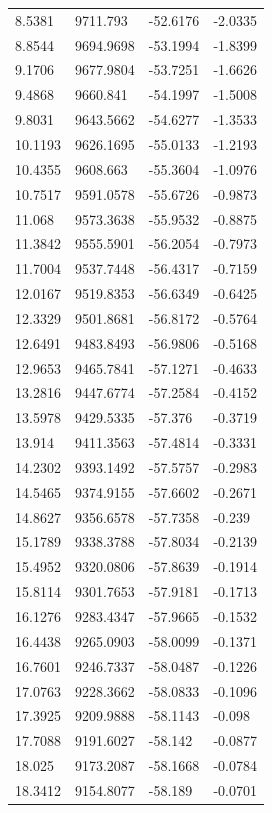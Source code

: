 \begin{table}[H]
\begin{tabular}{llll}
8.5381 & 9711.793 & -52.6176 & -2.0335 \\
8.8544 & 9694.9698 & -53.1994 & -1.8399 \\
9.1706 & 9677.9804 & -53.7251 & -1.6626 \\
9.4868 & 9660.841 & -54.1997 & -1.5008 \\
9.8031 & 9643.5662 & -54.6277 & -1.3533 \\
10.1193 & 9626.1695 & -55.0133 & -1.2193 \\
10.4355 & 9608.663 & -55.3604 & -1.0976 \\
10.7517 & 9591.0578 & -55.6726 & -0.9873 \\
11.068 & 9573.3638 & -55.9532 & -0.8875 \\
11.3842 & 9555.5901 & -56.2054 & -0.7973 \\
11.7004 & 9537.7448 & -56.4317 & -0.7159 \\
12.0167 & 9519.8353 & -56.6349 & -0.6425 \\
12.3329 & 9501.8681 & -56.8172 & -0.5764 \\
12.6491 & 9483.8493 & -56.9806 & -0.5168 \\
12.9653 & 9465.7841 & -57.1271 & -0.4633 \\
13.2816 & 9447.6774 & -57.2584 & -0.4152 \\
13.5978 & 9429.5335 & -57.376 & -0.3719 \\
13.914 & 9411.3563 & -57.4814 & -0.3331 \\
14.2302 & 9393.1492 & -57.5757 & -0.2983 \\
14.5465 & 9374.9155 & -57.6602 & -0.2671 \\
14.8627 & 9356.6578 & -57.7358 & -0.239 \\
15.1789 & 9338.3788 & -57.8034 & -0.2139 \\
15.4952 & 9320.0806 & -57.8639 & -0.1914 \\
15.8114 & 9301.7653 & -57.9181 & -0.1713 \\
16.1276 & 9283.4347 & -57.9665 & -0.1532 \\
16.4438 & 9265.0903 & -58.0099 & -0.1371 \\
16.7601 & 9246.7337 & -58.0487 & -0.1226 \\
17.0763 & 9228.3662 & -58.0833 & -0.1096 \\
17.3925 & 9209.9888 & -58.1143 & -0.098 \\
17.7088 & 9191.6027 & -58.142 & -0.0877 \\
18.025 & 9173.2087 & -58.1668 & -0.0784 \\
18.3412 & 9154.8077 & -58.189 & -0.0701 \\

\end{tabular}
\end{table}
